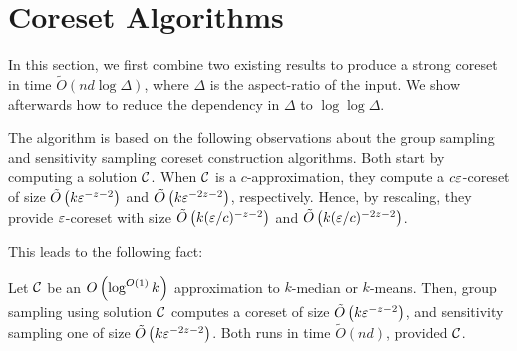 \section{Coreset Algorithms}
\label{sec:theory}
In this section, we first combine two existing results to produce a strong coreset  in time $\tilde{O}(nd \log \Delta)$, where $\Delta$ is the aspect-ratio of the input.
We show afterwards how to reduce the dependency in $\Delta$ to $\log \log \Delta$.


The algorithm is based on the following observations about the group
sampling \cite{stoc21} and sensitivity sampling \cite{FeldmanL11} coreset construction algorithms.
Both start by computing a solution $\mathcal C$. When $\mathcal C$ is a $c$-approximation, they compute a $c \varepsilon$-coreset of size $\tilde O\left(
k \varepsilon^{-z-2}\right)$ and $\tilde O\left( k \varepsilon^{-2z -2}\right)$, respectively. Hence, by rescaling, they provide $\varepsilon$-coreset with size $\tilde O\left(
k (\varepsilon/c)^{-z-2}\right)$ and $\tilde O\left( k (\varepsilon/c)^{-2z-2}\right)$. 

This leads to the following fact:
\begin{fact}\label{fact:logApprox}
Let $\mathcal C$ be an $O\left( \log^{O(1)} k\right)$ approximation to $k$-median or $k$-means.
Then, group sampling using solution $\mathcal C$ computes a coreset of size $\tilde O\left(
k \varepsilon^{-z-2}\right)$, and sensitivity sampling one of size $\tilde O\left( k \varepsilon^{-2z-2}\right)$. 
Both runs in time $\tilde O(nd)$, provided $\mathcal C$.
\end{fact}

%

